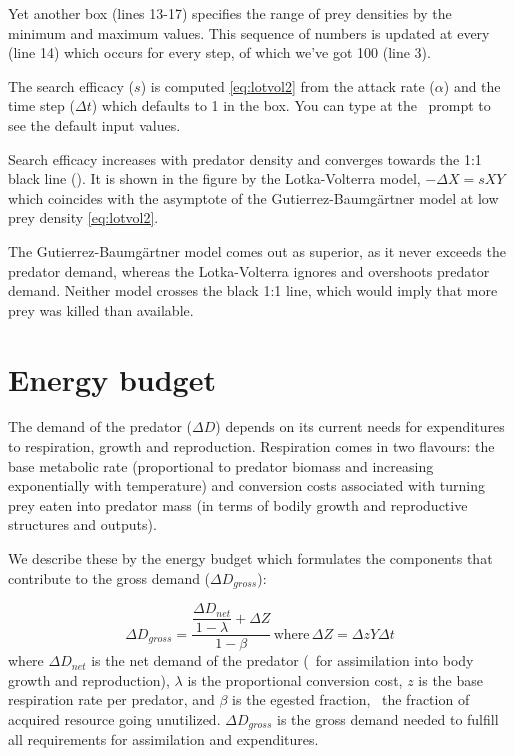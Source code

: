 Yet another  box (lines 13-17) specifies the range of prey densities by the minimum and maximum values. This sequence of numbers is updated at every  (line 14) which occurs for every step, of which we've got 100 (line 3).

The search efficacy ($s$) is computed \eqref{eq:lotvol2} from the attack rate ($\alpha$) and the time step ($\Delta t$) which defaults to 1 in the  box. You can type  at the \US\ prompt to see the default input values. 

Search efficacy increases with predator density and converges towards the 1:1 black line (). It is shown in the figure by the Lotka-Volterra model, $-\Delta X = sXY$ which coincides with the asymptote of the Gutierrez-Baumg{\"a}rtner model at low prey density \eqref{eq:lotvol2}. 

The Gutierrez-Baumg{\"a}rtner model comes out as superior, as it never exceeds the predator demand, whereas the Lotka-Volterra ignores and overshoots predator demand. Neither model crosses the black 1:1 line, which would imply that more prey was killed than available.


\section{Energy budget}
\label{ch:trophic-energy-budget}

The demand of the predator ($\Delta D$) depends on its current needs for expenditures to respiration, growth and reproduction. Respiration comes in two flavours: the base metabolic rate (proportional to predator biomass and increasing exponentially with temperature) and conversion costs associated with turning prey eaten into predator mass (in terms of bodily growth and reproductive structures and outputs).

We describe these by the energy budget \citep{GutiConc81} which formulates the components that contribute to the gross demand ($\Delta D_{gross}$):

\begin{equation}
\Delta D_{gross} = \dfrac{ \dfrac{\Delta D_{net}}{1-\lambda}+\Delta Z}{1-\beta}\, \text{where}\, \Delta Z = \Delta z Y \Delta t
\label{eq:demandbudget}
\end{equation}
where $\Delta D_{net}$ is the net demand of the predator (\eg\ for assimilation into body growth and reproduction), $\lambda$ is the proportional conversion cost, $z$ is the base respiration rate per predator, and $\beta$ is the egested fraction, \ie\ the fraction of acquired resource going unutilized. $\Delta D_{gross}$ is the gross demand needed to fulfill all requirements for assimilation and expenditures.

